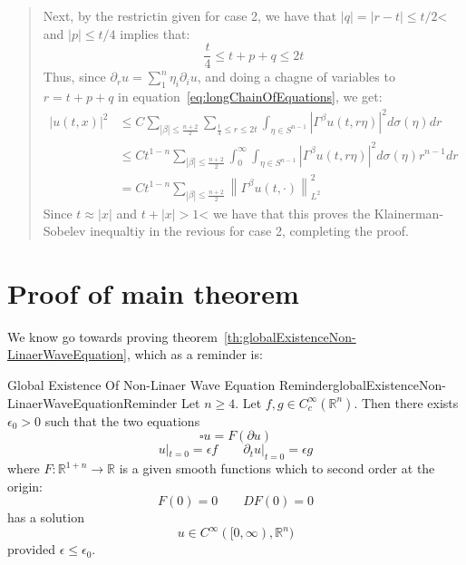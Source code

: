 \documentclass{book}
\newenvironment{Proof}[1][]
  {\begin{ProofTcb}[#1]}
  {\end{ProofTcb}}
\newcommand{\R}{{\mathbb{R}}}
\newcommand{\rw}{\rightarrow}
\begin{document}
\begin{Proof}
\begin{quote}
\begin{enumerate}
				 Next, by the restrictin given for case 2, we have that $|q| = |r-t| \le t/2$< and
				 $|p| \le t/4$ implies that:
				 \[
					 \frac{t}{4} \le t  + p + q \le 2t
				 \]
				 Thus, since $  \partial_r u = \sum_1^n \eta_i  \partial_i u$, and doing a chagne of
				 variables to $r = t + p + q$ in
				 equation~\ref{eq:longChainOfEquations}, we get:
				 \begin{align*}
					 |u(t,x)|^2 &\le C \sum_{|\beta| \le \frac{n+2}{2}} \sum_{\frac{t}{4} \le r \le
					 2t} \int _{\eta \in S^{n-1}} \left|\Gamma^\beta u(t,
					 r\eta)\right|^2 d\sigma(\eta)dr\\
								&\le Ct^{1-n} \sum_{|\beta| \le \frac{n+2}{2}}
								\int_0^\infty \int_{\eta \in S^{n-1}} \left|
								\Gamma^\beta u(t, r\eta)\right|^2
								d\sigma(\eta)r^{n-1}dr\\
								&= Ct^{1-n} \sum_{|\beta|\le \frac{n+2}{2}}
								\left\| \Gamma^\beta u(t, \cdot)\right\|_{L^2}^2
				 \end{align*}
				 Since $t \approx |x|$ and $t + |x| > 1$< we have that this proves the
				 Klainerman-Sobelev inequaltiy in the revious for case 2, completing the proof.
		\end{enumerate}
	\end{quote}
\end{Proof}

\section{Proof of main theorem}

We know go towards proving theorem~\ref{th:globalExistenceNon-LinaerWaveEquation}, which as a reminder is:


\begin{thm}{Global Existence Of Non-Linaer Wave Equation Reminder}{globalExistenceNon-LinaerWaveEquationReminder}
	Let $n \ge 4$. Let $f,g \in C_c^\infty(\R^n)$. Then there exists $\epsilon_0 > 0$ such that the two  equations
	\begin{equation}\label{eq:globalExistenceIReminder}
	  \square u = F(  \partial u )
	\end{equation}
	\begin{equation}\label{eq:globalExistenceIIReminder}
		u|_{t = 0} = \epsilon f \qquad  \partial_t u|_{t = 0} = \epsilon g
	\end{equation}
	where $F: \R^{1+n} \rw \R$ is a given smooth functions which to second order at the origin:
	\[
		F(0) = 0 \qquad DF(0) = 0
	\]
	has a solution
	\[
		u \in C^\infty([0, \infty), \R^n)
	\]
	provided $\epsilon \le \epsilon_0$.
\end{thm}
\end{document}
